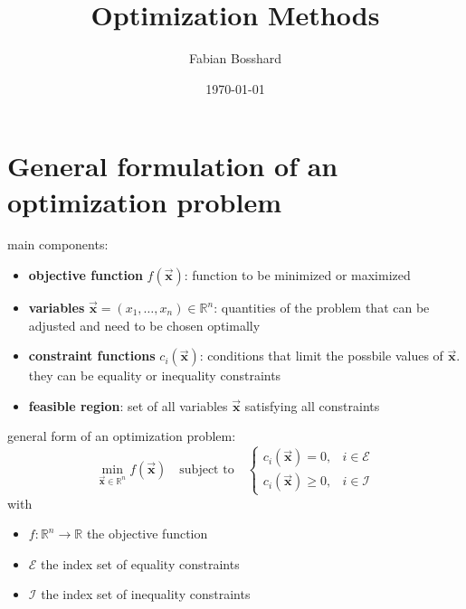 \documentclass[9pt, headings=standardclasses, parskip=half]{scrartcl}
\title{Optimization Methods}
\author{Fabian Bosshard}
\date{\today}
\renewcommand{\emph}[1]{\textcolor{mypurple}{#1}}
\newcommand{\vect}[1]{\vec{\boldsymbol{#1}}}
\begin{document}
\thispagestyle{empty}

\maketitle
\tableofcontents















\clearpage
{}  
\section{General formulation of an optimization problem}

main components:
\begin{itemize}
	\item \textbf{objective function} $f(\vect{x})$: function to be minimized or maximized
	\item \textbf{variables} $\vect{x} = (x_1, \ldots, x_n) \in \mathbb{R}^n$: quantities of the problem that can be adjusted and need to be chosen \emph{optimally}
	\item \textbf{constraint functions} $c_i(\vect{x})$: conditions that limit the possbile values of $\vect{x}$. they can be \emph{equality} or \emph{inequality} constraints
	\item \textbf{feasible region}: set of all variables $\vect{x}$ satisfying all constraints
\end{itemize}

general form of an optimization problem:
\begin{equation}
\label{eq:form_optimization_problem}
\boxed{
 \min_{\vect{x} \in \mathbb{R}^{n}} f(\vect{x}) \quad \text{subject to} \quad \begin{cases}c_{i}(\vect{x})=0, & i \in \mathcal{E} \\ c_{i}(\vect{x}) \geq 0, & i \in \mathcal{I}\end{cases}
 }
\end{equation}
with
\begin{itemize}
  \item \(f: \mathbb{R}^{n} \rightarrow \mathbb{R}\) the objective function
  \item \(\mathcal{E}\) the index set of equality constraints
  \item \(\mathcal{I}\) the index set of inequality constraints
\end{itemize}
\end{document}
